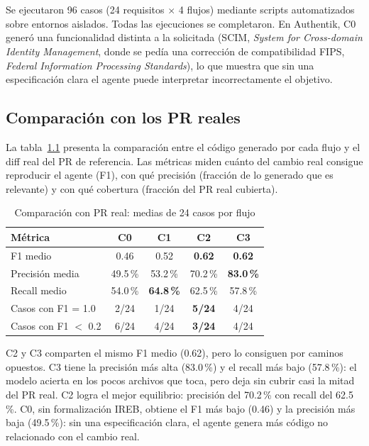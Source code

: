 \chapter{\resultsname}
\label{chap:resultados}

Se ejecutaron 96 casos (24 requisitos $\times$ 4 flujos) mediante scripts automatizados sobre entornos aislados. Todas las ejecuciones se completaron. En Authentik, C0 gener\'o una funcionalidad distinta a la solicitada (SCIM, \emph{System for Cross-domain Identity Management}, donde se ped\'ia una correcci\'on de compatibilidad FIPS, \emph{Federal Information Processing Standards}), lo que muestra que sin una especificaci\'on clara el agente puede interpretar incorrectamente el objetivo.

\section{Comparaci\'on con los PR reales}

La tabla~\ref{tab:f1-global} presenta la comparaci\'on entre el c\'odigo generado por cada flujo y el diff real del PR de referencia. Las m\'etricas miden cu\'anto del cambio real consigue reproducir el agente (F1), con qu\'e precisi\'on (fracci\'on de lo generado que es relevante) y con qu\'e cobertura (fracci\'on del PR real cubierta).

\begin{table}[htbp]
\centering
\caption{Comparaci\'on con PR real: medias de 24 casos por flujo}
\label{tab:f1-global}
\begin{tabular}{lcccc}
\toprule
\textbf{M\'etrica} & \textbf{C0} & \textbf{C1} & \textbf{C2} & \textbf{C3} \\
\midrule
F1 medio & 0.46 & 0.52 & \textbf{0.62} & \textbf{0.62} \\
Precisi\'on media & 49.5\,\% & 53.2\,\% & 70.2\,\% & \textbf{83.0\,\%} \\
Recall medio & 54.0\,\% & \textbf{64.8\,\%} & 62.5\,\% & 57.8\,\% \\
\midrule
Casos con F1 = 1.0 & 2/24 & 1/24 & \textbf{5/24} & 4/24 \\
Casos con F1 $<$ 0.2 & 6/24 & 4/24 & \textbf{3/24} & 4/24 \\
\bottomrule
\end{tabular}
\end{table}

C2 y C3 comparten el mismo F1 medio (0.62), pero lo consiguen por caminos opuestos. C3 tiene la precisi\'on m\'as alta (83.0\,\%) y el recall m\'as bajo (57.8\,\%): el modelo acierta en los pocos archivos que toca, pero deja sin cubrir casi la mitad del PR real. C2 logra el mejor equilibrio: precisi\'on del 70.2\,\% con recall del 62.5\,\%. C0, sin formalizaci\'on IREB, obtiene el F1 m\'as bajo (0.46) y la precisi\'on m\'as baja (49.5\,\%): sin una especificaci\'on clara, el agente genera m\'as c\'odigo no relacionado con el cambio real.

